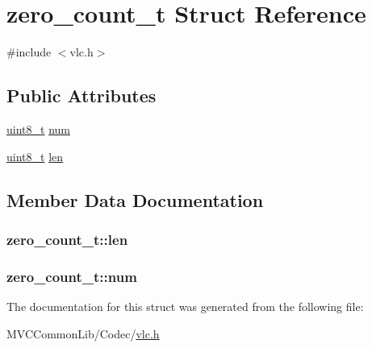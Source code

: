 \hypertarget{structzero__count__t}{
\section{zero\_\-count\_\-t Struct Reference}
\label{structzero__count__t}
}


{\ttfamily \#include $<$vlc.h$>$}

\subsection*{Public Attributes}
\begin{DoxyCompactItemize}
\item 
\hyperlink{_types_8h_a363e4d606232036a6b89060813c45489}{uint8\_\-t} \hyperlink{structzero__count__t_a421978d0cc700d1b484dea8dff38f807}{num}
\item 
\hyperlink{_types_8h_a363e4d606232036a6b89060813c45489}{uint8\_\-t} \hyperlink{structzero__count__t_a6e0084b086508dedc5d54fe27bc7eb96}{len}
\end{DoxyCompactItemize}


\subsection{Member Data Documentation}
\hypertarget{structzero__count__t_a6e0084b086508dedc5d54fe27bc7eb96}{
\subsubsection[{len}]{ {\bf zero\_\-count\_\-t::len}}}
\label{structzero__count__t_a6e0084b086508dedc5d54fe27bc7eb96}
\hypertarget{structzero__count__t_a421978d0cc700d1b484dea8dff38f807}{
\subsubsection[{num}]{ {\bf zero\_\-count\_\-t::num}}}
\label{structzero__count__t_a421978d0cc700d1b484dea8dff38f807}


The documentation for this struct was generated from the following file:\begin{DoxyCompactItemize}
\item 
MVCCommonLib/Codec/\hyperlink{vlc_8h}{vlc.h}\end{DoxyCompactItemize}
